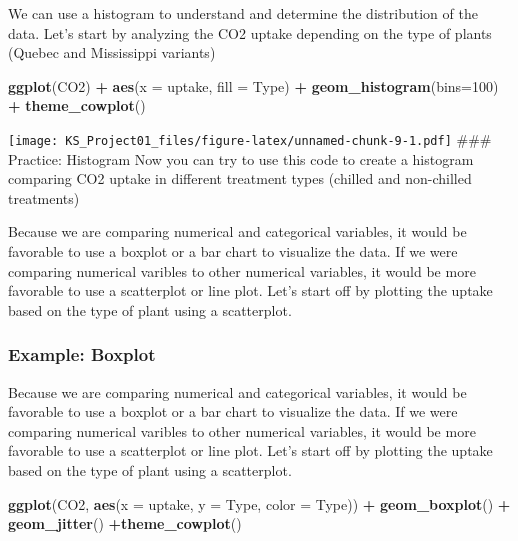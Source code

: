 \documentclass[
]{article}
\newenvironment{Shaded}{\begin{snugshade}}{\end{snugshade}}
\newcommand{\AttributeTok}[1]{\textcolor[rgb]{0.13,0.29,0.53}{#1}}
\newcommand{\DecValTok}[1]{\textcolor[rgb]{0.00,0.00,0.81}{#1}}
\newcommand{\FunctionTok}[1]{\textcolor[rgb]{0.13,0.29,0.53}{\textbf{#1}}}
\newcommand{\NormalTok}[1]{#1}
\newcommand{\SpecialCharTok}[1]{\textcolor[rgb]{0.81,0.36,0.00}{\textbf{#1}}}
\begin{document}
We can use a histogram to understand and determine the distribution of
the data. Let's start by analyzing the CO2 uptake depending on the type
of plants (Quebec and Mississippi variants)

\begin{Shaded}
\begin{Highlighting}[]
\FunctionTok{ggplot}\NormalTok{(CO2) }\SpecialCharTok{+}
  \FunctionTok{aes}\NormalTok{(}\AttributeTok{x =}\NormalTok{ uptake, }\AttributeTok{fill =}\NormalTok{ Type) }\SpecialCharTok{+}
  \FunctionTok{geom\_histogram}\NormalTok{(}\AttributeTok{bins=}\DecValTok{100}\NormalTok{) }\SpecialCharTok{+}
  \FunctionTok{theme\_cowplot}\NormalTok{()}
\end{Highlighting}
\end{Shaded}

\texttt{[image: KS\_Project01\_files/figure-latex/unnamed-chunk-9-1.pdf]}
\#\#\# Practice: Histogram Now you can try to use this code to create a
histogram comparing CO2 uptake in different treatment types (chilled and
non-chilled treatments)

Because we are comparing numerical and categorical variables, it would
be favorable to use a boxplot or a bar chart to visualize the data. If
we were comparing numerical varibles to other numerical variables, it
would be more favorable to use a scatterplot or line plot. Let's start
off by plotting the uptake based on the type of plant using a
scatterplot.

\subsubsection{Example: Boxplot}\label{example-boxplot}

Because we are comparing numerical and categorical variables, it would
be favorable to use a boxplot or a bar chart to visualize the data. If
we were comparing numerical varibles to other numerical variables, it
would be more favorable to use a scatterplot or line plot. Let's start
off by plotting the uptake based on the type of plant using a
scatterplot.

\begin{Shaded}
\begin{Highlighting}[]
\FunctionTok{ggplot}\NormalTok{(CO2, }\FunctionTok{aes}\NormalTok{(}\AttributeTok{x =}\NormalTok{ uptake, }\AttributeTok{y =}\NormalTok{ Type, }\AttributeTok{color =}\NormalTok{ Type)) }\SpecialCharTok{+}
    \FunctionTok{geom\_boxplot}\NormalTok{() }\SpecialCharTok{+} \FunctionTok{geom\_jitter}\NormalTok{() }\SpecialCharTok{+}\FunctionTok{theme\_cowplot}\NormalTok{()}
\end{Highlighting}
\end{Shaded}
\end{document}
